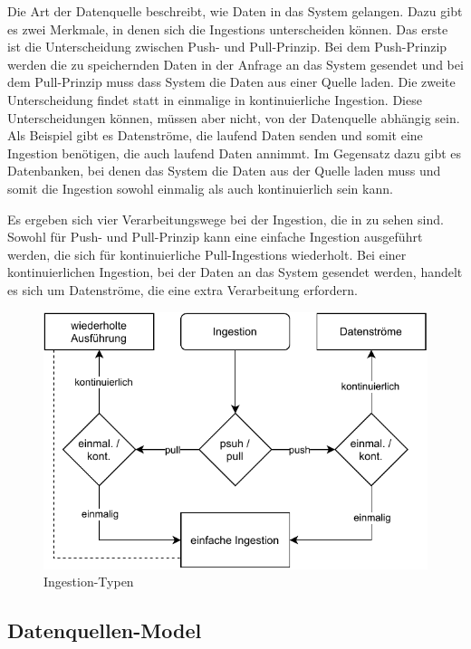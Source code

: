 Die Art der Datenquelle beschreibt, wie Daten in das System gelangen.
Dazu gibt es zwei Merkmale, in denen sich die Ingestions unterscheiden können.
Das erste ist die Unterscheidung zwischen Push- und Pull-Prinzip.
Bei dem Push-Prinzip werden die zu speichernden Daten in der Anfrage an das System gesendet und bei dem Pull-Prinzip muss dass System die Daten aus einer Quelle laden.
Die zweite Unterscheidung findet statt in einmalige in kontinuierliche Ingestion.
Diese Unterscheidungen können, müssen aber nicht, von der Datenquelle abhängig sein.
Als Beispiel gibt es Datenströme, die laufend Daten senden und somit eine Ingestion benötigen, die auch laufend Daten annimmt.
Im Gegensatz dazu gibt es Datenbanken, bei denen das System die Daten aus der Quelle laden muss und somit die Ingestion sowohl einmalig als auch kontinuierlich sein kann.

Es ergeben sich vier Verarbeitungswege bei der Ingestion, die in  zu sehen sind.
Sowohl für Push- und Pull-Prinzip kann eine einfache Ingestion ausgeführt werden, die sich für kontinuierliche Pull-Ingestions wiederholt.
Bei einer kontinuierlichen Ingestion, bei der Daten an das System gesendet werden, handelt es sich um Datenströme, die eine extra Verarbeitung erfordern.

\begin{figure}
  \centering
  \includegraphics{Grafiken/ingestion-types.pdf}
  \caption{Ingestion-Typen}
  \label{fig:ingestion_types}
\end{figure}

\subsection{Datenquellen-Model}

